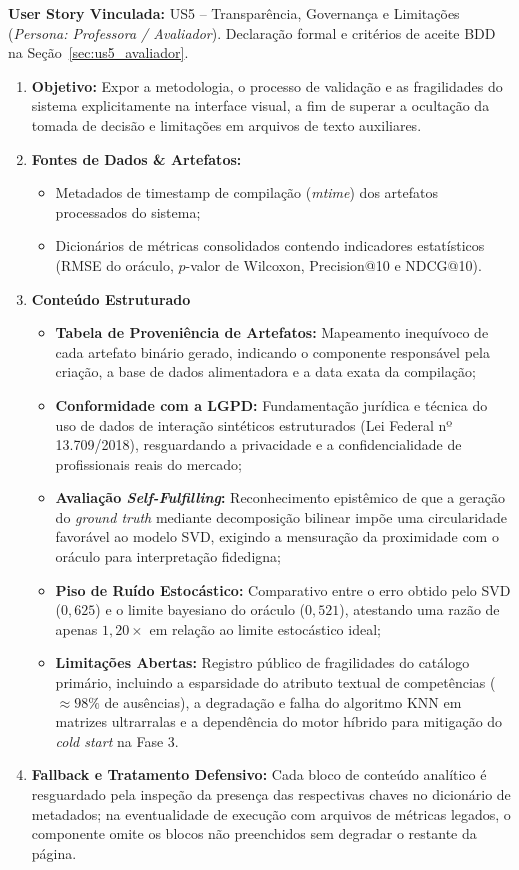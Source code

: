 \noindent\textbf{User Story Vinculada:} US5 -- Transparência, Governança e Limitações (\textit{Persona: Professora / Avaliador}).
Declaração formal e critérios de aceite BDD na Seção~\ref{sec:us5_avaliador}.

\begin{enumerate}[label=\textbf{\arabic*.}]
    \item \textbf{Objetivo:} Expor a metodologia, o processo de validação e as fragilidades do sistema explicitamente na interface visual, a fim de superar a ocultação da tomada de decisão e limitações em arquivos de texto auxiliares.
    \item \textbf{Fontes de Dados \& Artefatos:}
    \begin{itemize}
        \item Metadados de timestamp de compilação (\textit{mtime}) dos artefatos processados do sistema;
        \item Dicionários de métricas consolidados contendo indicadores estatísticos (RMSE do oráculo, $p$-valor de Wilcoxon, Precision@10 e NDCG@10).
    \end{itemize}
    \item \textbf{Conteúdo Estruturado}
    \begin{itemize}
        \item \textbf{Tabela de Proveniência de Artefatos:} Mapeamento inequívoco de cada artefato binário gerado, indicando o componente responsável pela criação, a base de dados alimentadora e a data exata da compilação;
        \item \textbf{Conformidade com a LGPD:} Fundamentação jurídica e técnica do uso de dados de interação sintéticos estruturados (Lei Federal nº 13.709/2018), resguardando a privacidade e a confidencialidade de profissionais reais do mercado;
        \item \textbf{Avaliação \textit{Self-Fulfilling}:} Reconhecimento epistêmico de que a geração do \textit{ground truth} mediante decomposição bilinear impõe uma circularidade favorável ao modelo SVD, exigindo a mensuração da proximidade com o oráculo para interpretação fidedigna;
        \item \textbf{Piso de Ruído Estocástico:} Comparativo entre o erro obtido pelo SVD ($0{,}625$) e o limite bayesiano do oráculo ($0{,}521$), atestando uma razão de apenas $1{,}20\times$ em relação ao limite estocástico ideal;
        \item \textbf{Limitações Abertas:} Registro público de fragilidades do catálogo primário, incluindo a esparsidade do atributo textual de competências ($\approx 98\%$ de ausências), a degradação e falha do algoritmo KNN em matrizes ultrarralas e a dependência do motor híbrido para mitigação do \textit{cold start} na Fase 3.
    \end{itemize}
    \item \textbf{Fallback e Tratamento Defensivo:} Cada bloco de conteúdo analítico é resguardado pela inspeção da presença das respectivas chaves no dicionário de metadados; na eventualidade de execução com arquivos de métricas legados, o componente omite os blocos não preenchidos sem degradar o restante da página.
\end{enumerate}


